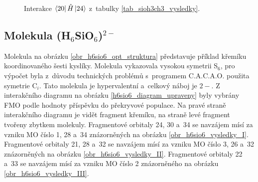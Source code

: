 \documentclass[
  printed, %
  table,   %
  lof,     %
  lot,     %
  oneside,
]{fithesis3}
\begin{document}
 
\begin{figure}
\begin{center}
\caption{Interakce $\bra{20}{\hat{H}}\ket{24}$  z~tabulky \ref{tab_sioh3ch3_vysledky}.}

\label{obr_sioh3ch3_vysledky_IV}\end{center}
\end{figure} 
  \subsection{Molekula (H$_6$SiO$_6$)$^{2-}$}
  Molekula  na obrázku \ref{obr_h6sio6_opt_struktura} představuje příklad křemíku koordinovaného šesti kyslíky. Molekula vykazovala vysokou symetrii S$_6$, pro výpočet byla z~důvodu technických problémů s~programem C.A.C.A.O. použita symetrie C$_i$. Tato molekula je hypervalentní a~celkový náboj je $2-$. Z interakčního diagramu na obrázku \ref{h6sio6_diagram_upraveny} byly vybrány FMO podle hodnoty příspěvku do překryvové populace. Na pravé straně interakčního diagramu je vidět fragment křemíku, na straně levé fragment tvořeny zbytkem molekuly. Fragmentové orbitaly  24, 30 a~34 se navzájem mísí za vzniku MO číslo 1, 28 a~34 znázorněných na obrázku \ref{obr_h6sio6_vysledky_I}. Fragmentové orbitaly  21, 28 a~32 se navzájem mísí za vzniku MO číslo 3, 26 a~32 znázorněných na obrázku \ref{obr_h6sio6_vysledky_II}. Fragmentové orbitaly  22 a~33 se navzájem mísí za vzniku MO číslo 2 znázorněného na obrázku \ref{obr_h6sio6_vysledky_III}. 
  
\end{document}

